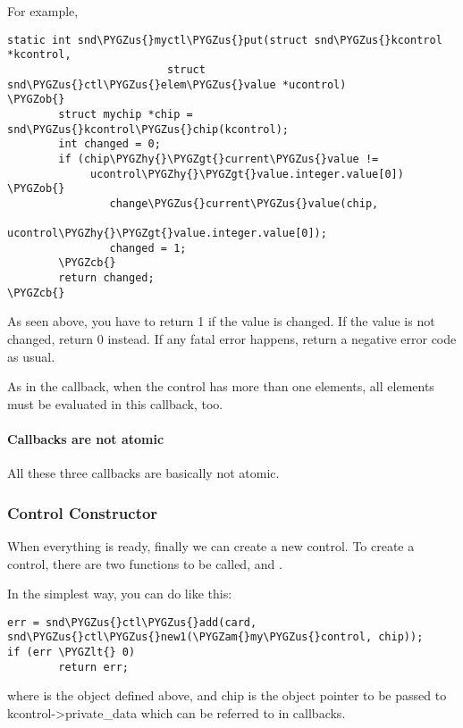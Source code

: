 \documentclass[a4paper,8pt,english]{sphinxmanual}
\def\PYGZus{\char`\_}
\def\PYGZob{\char`\{}
\def\PYGZcb{\char`\}}
\def\PYGZam{\char`\&}
\def\PYGZlt{\char`\<}
\def\PYGZgt{\char`\>}
\def\PYGZhy{\char`\-}
\begin{document}
For example,

\begin{Verbatim}[commandchars=\\\{\}]
static int snd\PYGZus{}myctl\PYGZus{}put(struct snd\PYGZus{}kcontrol *kcontrol,
                         struct snd\PYGZus{}ctl\PYGZus{}elem\PYGZus{}value *ucontrol)
\PYGZob{}
        struct mychip *chip = snd\PYGZus{}kcontrol\PYGZus{}chip(kcontrol);
        int changed = 0;
        if (chip\PYGZhy{}\PYGZgt{}current\PYGZus{}value !=
             ucontrol\PYGZhy{}\PYGZgt{}value.integer.value[0]) \PYGZob{}
                change\PYGZus{}current\PYGZus{}value(chip,
                            ucontrol\PYGZhy{}\PYGZgt{}value.integer.value[0]);
                changed = 1;
        \PYGZcb{}
        return changed;
\PYGZcb{}
\end{Verbatim}

As seen above, you have to return 1 if the value is changed. If the
value is not changed, return 0 instead. If any fatal error happens,
return a negative error code as usual.

As in the  callback, when the control has more than one
elements, all elements must be evaluated in this callback, too.


\paragraph{Callbacks are not atomic}
\label{sound/kernel-api/writing-an-alsa-driver:callbacks-are-not-atomic}
All these three callbacks are basically not atomic.


\subsubsection{Control Constructor}
\label{sound/kernel-api/writing-an-alsa-driver:control-constructor}
When everything is ready, finally we can create a new control. To create
a control, there are two functions to be called,
 and .

In the simplest way, you can do like this:

\begin{Verbatim}[commandchars=\\\{\}]
err = snd\PYGZus{}ctl\PYGZus{}add(card, snd\PYGZus{}ctl\PYGZus{}new1(\PYGZam{}my\PYGZus{}control, chip));
if (err \PYGZlt{} 0)
        return err;
\end{Verbatim}

where  is the  object defined above, and chip is the object
pointer to be passed to kcontrol-\textgreater{}private\_data which can be referred
to in callbacks.
\end{document}
